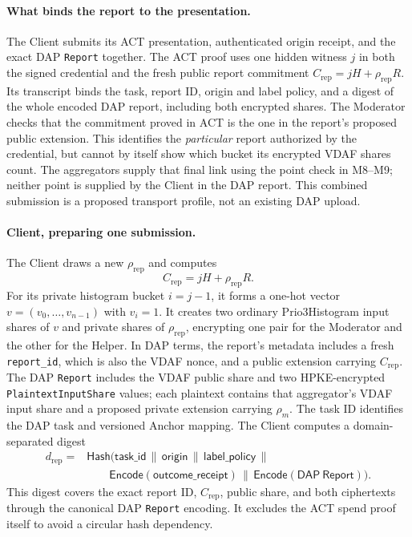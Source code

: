 \documentclass[11pt]{article}
\newcommand{\Crep}{C_{\mathrm{rep}}}
\newcommand{\Hash}{\mathsf{Hash}}
\newcommand{\Enc}{\mathsf{Encode}}
\begin{document}
\paragraph{What binds the report to the presentation.}
The Client submits its ACT presentation, authenticated origin receipt, and
the exact DAP \texttt{Report} together. The ACT proof uses one hidden witness
$j$ in both the signed credential and the fresh public report commitment
$\Crep=jH+\rho_{\mathrm{rep}}R$. Its transcript binds the task, report ID,
origin and label policy, and a digest of the whole encoded DAP report,
including both encrypted shares. The Moderator checks that the commitment
proved in ACT is the one in the report's proposed public extension. This
identifies the \emph{particular} report authorized by the credential, but
cannot by itself show which bucket its encrypted VDAF shares count. The
aggregators supply that final link using the point check in M8--M9; neither
point is supplied by the Client in the DAP report. This combined submission
is a proposed transport profile, not an existing DAP upload.

\paragraph{Client, preparing one submission.}
The Client draws a new $\rho_{\mathrm{rep}}$ and computes
\begin{equation}
  \Crep=jH+\rho_{\mathrm{rep}}R.
  \label{eq:report}
\end{equation}
For its private histogram bucket $i=j-1$, it forms a one-hot vector
$v=(v_0,\ldots,v_{n-1})$ with $v_i=1$.
It creates two ordinary Prio3Histogram input shares of $v$ and private
shares of $\rho_{\mathrm{rep}}$, encrypting one pair for the Moderator and the other
for the Helper. In DAP terms, the report's metadata includes a fresh
\texttt{report\_id}, which is also the VDAF nonce, and a public extension
carrying $\Crep$. The DAP \texttt{Report} includes the VDAF public share
and two HPKE-encrypted \texttt{PlaintextInputShare} values; each plaintext
contains that aggregator's VDAF input share and a proposed private extension
carrying $\rho_m$. The task ID identifies the DAP task and versioned
Anchor mapping. The Client computes a domain-separated digest
\begin{align}
  d_{\mathrm{rep}}={}&\Hash(\mathsf{task\_id}\,\|\,\mathsf{origin}\,\|\,
    \mathsf{label\_policy}\,\|\,\nonumber\\
    &\qquad\Enc(\mathsf{outcome\_receipt})\,\|\,
    \Enc(\mathsf{DAP\ Report})).
  \label{eq:digest}
\end{align}
This digest covers the exact report ID, $\Crep$, public share, and both
ciphertexts through the canonical DAP \texttt{Report} encoding. It excludes
the ACT spend proof itself to avoid a circular hash dependency.
\end{document}
